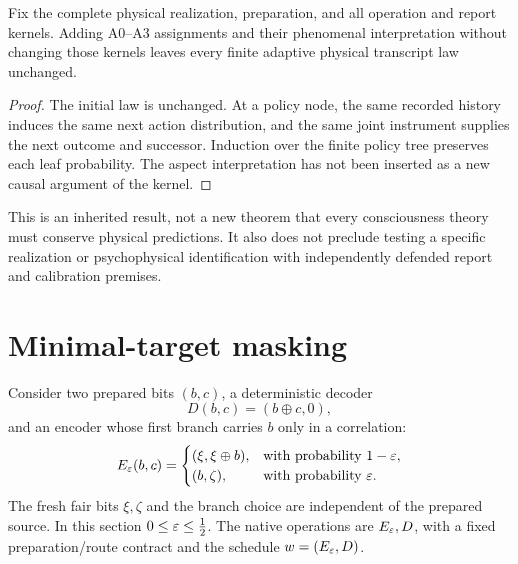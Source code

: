\begin{proposition}\label{p2-31}
Fix the complete physical realization, preparation, and all operation and report kernels. Adding A0--A3 assignments and their phenomenal interpretation without changing those kernels leaves every finite adaptive physical transcript law unchanged.
\end{proposition}
\begin{proof}
The initial law is unchanged. At a policy node, the same recorded history induces the same next action distribution, and the same joint instrument supplies the next outcome and successor. Induction over the finite policy tree preserves each leaf probability. The aspect interpretation has not been inserted as a new causal argument of the kernel.
\end{proof}
This is an inherited result, not a new theorem that every consciousness theory must conserve physical predictions. It also does not preclude testing a specific realization or psychophysical identification with independently defended report and calibration premises.



\section{Minimal-target masking}\label{sec:masking}
Consider two prepared bits \((b,c)\), a deterministic decoder
\begin{equation}\label{eq:decoder}
 D(b,c)=(b\oplus c,0),
\end{equation}
and an encoder whose first branch carries \(b\) only in a correlation:
\begin{equation}\label{eq:encoder}
 E_\varepsilon(b,c)=
 \begin{cases}
 (\xi,\xi\oplus b),&\text{with probability }1-\varepsilon,\\
 (b,\zeta),&\text{with probability }\varepsilon.
 \end{cases}
\end{equation}
The fresh fair bits \(\xi,\zeta\) and the branch choice are independent of the prepared source. In this section \(0\le\varepsilon\le\tfrac12\). The native operations are \(E_\varepsilon,D\), with a fixed preparation/route contract and the schedule \(w=(E_\varepsilon,D)\).

